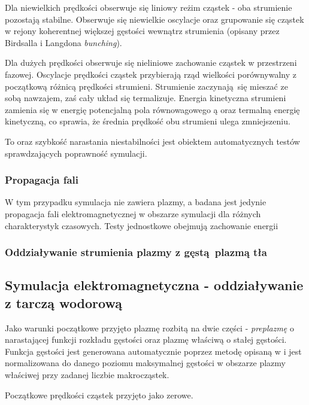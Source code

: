     Dla niewielkich prędkości  obserwuje się
    liniowy reżim cząstek - oba strumienie pozostają stabilne. Obserwuje się niewielkie oscylacje oraz
grupowanie się cząstek w rejony koherentnej większej gęstości wewnątrz strumienia (opisany przez Birdsalla i Langdona \emph{bunching}).

    Dla dużych prędkości  obserwuje się nieliniowe
    zachowanie cząstek w przestrzeni fazowej. Oscylacje prędkości cząstek przybierają rząd wielkości porównywalny
    z początkową różnicą prędkości strumieni.
 Strumienie zaczynają się mieszać ze sobą nawzajem, zaś cały układ się termalizuje. Energia kinetyczna 
 strumieni zamienia się w energię potencjalną pola równowagowego ą %
oraz termalną energię kinetyczną, co sprawia, że średnia prędkość obu strumieni ulega zmniejszeniu. %

To oraz szybkość narastania niestabilności jest obiektem automatycznych testów sprawdzających poprawność symulacji.

\subsubsection{Propagacja fali}
W tym przypadku symulacja nie zawiera plazmy, a badana jest jedynie propagacja fali elektromagnetycznej w obszarze
symulacji dla różnych charakterystyk czasowych. %
Testy jednostkowe obejmują zachowanie energii %

\subsubsection{Oddziaływanie strumienia plazmy z gęstą plazmą tła}

    \subsection{Symulacja elektromagnetyczna - oddziaływanie z tarczą wodorową}

    Jako warunki początkowe przyjęto plazmę rozbitą na dwie części - \emph{preplazmę} o narastającej funkcji rozkładu
    gęstości oraz plazmę właściwą o stałej gęstości. Funkcja gęstości jest generowana automatycznie poprzez metodę opisaną
    w %
    i jest normalizowana do danego poziomu maksymalnej gęstości w obszarze plazmy właściwej przy zadanej liczbie makrocząstek.

    Początkowe prędkości cząstek przyjęto jako zerowe.

